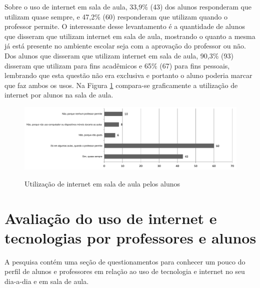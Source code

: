 Sobre o uso de internet em sala de aula, 33,9\% (43) dos alunos responderam que utilizam quase sempre, e 47,2\% (60) responderam que utilizam quando o professor permite. O interessante desse levantamento é a quantidade de alunos que disseram que utilizam internet em sala de aula, mostrando o quanto a mesma já está presente no ambiente escolar seja com a aprovação do professor ou não. Dos alunos que disseram que utilizam internet em sala de aula, 90,3\% (93) disseram que utilizam para fins acadêmicos e 65\% (67) para fins pessoais, lembrando que esta questão não era exclusiva e portanto o aluno poderia marcar que faz ambos os usos. Na Figura \ref{fig:grafico_uso_internet_alunos_sala} compara-se graficamente a utilização de internet por alunos na sala de aula.

\begin{figure}
\centering
\caption{Utilização de internet em sala de aula pelos alunos}
\includegraphics[width=1.0\textwidth]{pdfs/alunos-professores/pesquisa-alunos-uso-internet-sala.pdf} 
\label{fig:grafico_uso_internet_alunos_sala} 
\end{figure}




\section{Avaliação do uso de internet e tecnologias por professores e alunos}

A pesquisa contém uma seção de questionamentos para conhecer um pouco do perfil de alunos e professores em relação ao uso de tecnologia e internet no seu dia-a-dia e em sala de aula. 

